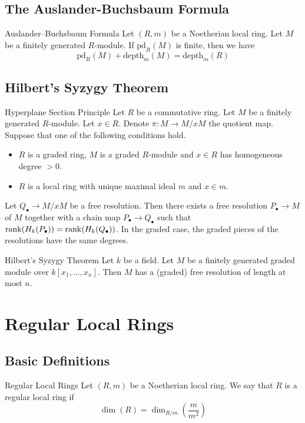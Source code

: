 \documentclass[a4paper]{article}
\begin{document}
\subsection{The Auslander-Buchsbaum Formula}
\begin{thm}{Auslander–Buchsbaum Formula}{} Let $(R,m)$ be a Noetherian local ring. Let $M$ be a finitely generated $R$-module. If $\text{pd}_R(M)$ is finite, then we have $$\text{pd}_R(M)+\text{depth}_m(M)=\text{depth}_m(R)$$
\end{thm}

\subsection{Hilbert's Syzygy Theorem}
\begin{lmm}{Hyperplane Section Principle}{} Let $R$ be a commutative ring. Let $M$ be a finitely generated $R$-module. Let $x\in R$. Denote $\pi:M\to M/xM$ the quotient map. Suppose that one of the following conditions hold. 
\begin{itemize}
\item $R$ is a graded ring, $M$ is a graded $R$-module and $x\in R$ has homogeneous degree $>0$. 
\item $R$ is a local ring with unique maximal ideal $m$ and $x\in m$. 
\end{itemize}
Let $Q_\bullet\to M/xM$ be a free resolution. Then there exists a free resolution $P_\bullet\to M$ of $M$ together with a chain map $P_\bullet\to Q_\bullet$ such that $\rank(H_k(P_\bullet))=\rank(H_k(Q_\bullet))$. In the graded case, the graded pieces of the resolutions have the same degrees. 
\end{lmm}

\begin{thm}{Hilbert's Syzygy Theorem}{} Let $k$ be a field. Let $M$ be a finitely generated graded module over $k[x_1,\dots,x_n]$. Then $M$ has a (graded) free resolution of length at most $n$. 
\end{thm}

\pagebreak
\section{Regular Local Rings}
\subsection{Basic Definitions}
\begin{defn}{Regular Local Rings}{} Let $(R,m)$ be a Noetherian local ring. We say that $R$ is a regular local ring if $$\dim(R)=\dim_{R/m}\left(\frac{m}{m^2}\right)$$
\end{defn}
\end{document}
